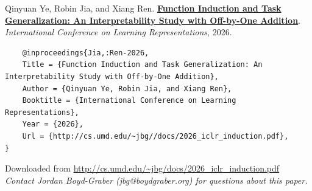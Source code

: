 \documentclass[a4paper]{article}
\begin{document}
    Qinyuan Ye, Robin Jia, and Xiang Ren.  {\bf \href{http://cs.umd.edu/~jbg//docs/2026_iclr_induction.pdf}{Function Induction and Task Generalization: An Interpretability Study with Off-by-One Addition}}.  \emph{International Conference on Learning Representations}, 2026.



    \vspace{5cm}

    \begin{verbatim}
    @inproceedings{Jia,:Ren-2026,
	Title = {Function Induction and Task Generalization: An Interpretability Study with Off-by-One Addition},
	Author = {Qinyuan Ye, Robin Jia, and Xiang Ren},
	Booktitle = {International Conference on Learning Representations},
	Year = {2026},
	Url = {http://cs.umd.edu/~jbg//docs/2026_iclr_induction.pdf},
}

    \end{verbatim}

    

    

    

    \vspace{3cm}
    Downloaded from \url{http://cs.umd.edu/~jbg/docs/2026_iclr_induction.pdf}  \\

    \vspace{2cm}
    \textit{Contact Jordan Boyd-Graber (jbg@boydgraber.org) for questions about this paper.}

    

    
\end{document}
